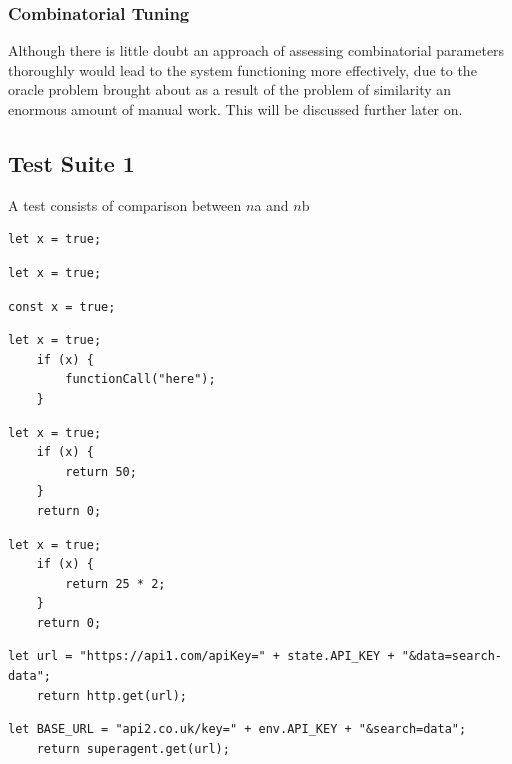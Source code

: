 \documentclass[jou,apacite]{apa6}
\begin{document}
\subsubsection{Combinatorial Tuning}
Although there is little doubt an approach of assessing combinatorial parameters thoroughly  would lead to the system functioning more effectively, due to the oracle problem brought about as a result of the problem of similarity an enormous amount of manual work. This will be discussed further later on.

\subsection{Test Suite 1}
A test consists of comparison between $n$a and $n$b
\begin{lstlisting}[caption=Comparison 1a \& 1b - Identical]
	let x = true;
\end{lstlisting}

\begin{lstlisting}[caption=Comparison 2a - Let against const]
	let x = true;
\end{lstlisting}
\begin{lstlisting}[caption=Comparison 2b - Let against const]
	const x = true;
\end{lstlisting}

\begin{lstlisting}[caption=Comparison 3a \& 3b - Identical extended]
	let x = true;
	if (x) {
		functionCall("here");
	}
\end{lstlisting}

\begin{lstlisting}[caption=Comparison 4a - Effect of numeric literal vs numberic expression]
	let x = true;
	if (x) {
		return 50;
	}
	return 0;
\end{lstlisting}

\begin{lstlisting}[caption=Comparison 4b - Effect of numeric literal vs numberic expression]
	let x = true;
	if (x) {
		return 25 * 2;
	}
	return 0;
\end{lstlisting}

\begin{lstlisting}[caption=Comparison 5a - Similar functions with literal and identifier name changes]
	let url = "https://api1.com/apiKey=" + state.API_KEY + "&data=search-data";
	return http.get(url);
\end{lstlisting}

\begin{lstlisting}[caption=Comparison 5b - Similar functions with literal and identifier name changes]
	let BASE_URL = "api2.co.uk/key=" + env.API_KEY + "&search=data";
	return superagent.get(url);
\end{lstlisting}
\end{document}
